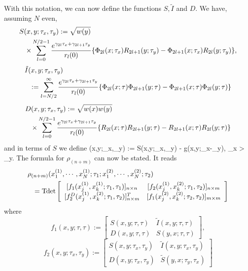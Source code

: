 With this notation, we can now define the functions $S, \tilde{I}$ 
and $D$. We have, 
assuming $N$ even, 
\begin{eqnarray} 
\label{2.o} 
\lefteqn{
S(x,y;\tau_x,\tau_y)  :=   \sqrt{w(y)}} \nonumber \\
& & \times 
\sum_{l=0}^{N/2-1} \frac{e^{\gamma_{2l}\tau_x + \gamma_{2l+1}\tau_y}}
{r_{l}(0)}
\{ \Phi_{2 l }(x;\tau_x)  R_{2 l + 1}(y;\tau_y) -
\Phi_{2 l + 1}(x;\tau_x)  R_{2 l}(y;\tau_y) \}, 
\end{eqnarray}
\begin{eqnarray}
\label{2.p} \lefteqn{
\tilde{I}(x,y;\tau_x,\tau_y)} \nonumber \\
  &  & :=
\sum_{l=N/2}^\infty  \frac{e^{\gamma_{2l}\tau_x + \gamma_{2l+1}\tau_y}}
{r_{l}(0)}
\{ \Phi_{2 l}(x;\tau) \Phi_{2 l + 1}(y;\tau) -
\Phi_{2 l + 1}(x;\tau) \Phi_{2 l}(y;\tau) \}
\end{eqnarray}
\begin{eqnarray}
\label{2.q}\lefteqn{ 
D(x,y;\tau_x,\tau_y)  :=   \sqrt{w(x)w(y)} } \nonumber \\ && \times
\sum_{l=0}^{N/2-1} \frac{e^{\gamma_{2l}\tau_x + \gamma_{2l+1}\tau_y}}
{r_{l}(0)}
\{ R_{2 l }(x;\tau) R_{2 l + 1}(y;\tau) -
R_{2 l + 1}(x;\tau) R_{2 l }(y;\tau) \} 
\end{eqnarray}
and in terms of $S$ we define 
\beqa 
\label{2.r}
(x,y;\tau_x,\tau_y) := S(x,y;\tau_x,\tau_y) - g(x,y;\tau_x-\tau_y),
\quad \tau_x > \tau_y.
\eeqa
The formula for $\rho_{(n+m)}$ can now be stated. It reads \cite{NF98a}
\begin{eqnarray} 
\lefteqn{\rho_{(n+m)}(x_1^{(1)},\cdots,x_N^{(1)};\tau_1;
x_1^{(2)},\cdots,x_N^{(2)};\tau_2)} \nonumber \\ && = {\rm Tdet}
\left [ \begin{array}{cc} [f_1(x_j^{(1)},x_k^{(1)};\tau_1,\tau_1)
]_{n \times n}
& [f_2(x_j^{(1)},x_k^{(2)};\tau_1,\tau_2)]_{n \times m} \\{}
 [f_2^D(x_j^{(1)},x_k^{(2)};\tau_1,\tau_2)]_{n \times m}^T & 
 [f_1(x_j^{(2)},x_k^{(2)};\tau_2,\tau_2)
 ]_{m \times m} \end{array} \right ]
\label{2.s}
\end{eqnarray}
where 
$$
f_1(x,y;\tau,\tau) := \left [ \begin{array}{cc}
S(x,y;\tau,\tau) & \tilde{I}(x,y;\tau,\tau) \\
D(x,y;\tau,\tau) & S(y,x;\tau,\tau) \end{array} \right ],
$$
$$ 
f_2(x,y;\tau_x,\tau_y) := \left [ \begin{array}{cc}
S(x,y;\tau_x,\tau_y) & \tilde{I}(x,y;\tau_x,\tau_y) \\
D(x,y;\tau_x,\tau_y) & \tilde{S}(y,x;\tau_y,\tau_x) \end{array} \right ]
$$
